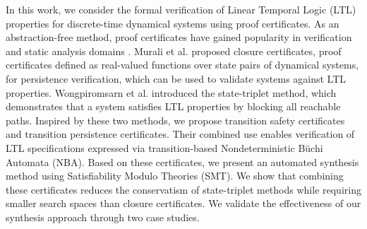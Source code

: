 In this work, we consider the formal verification of Linear Temporal Logic (LTL) properties for discrete-time dynamical systems using proof certificates. As an abstraction-free method, proof certificates have gained popularity in verification and static analysis domains \cite{chakarov2013probabilistic,chatterjee2016algorithmic,chatterjee2024sound,chatterjee2024equivalence}. Murali et al. \cite{murali2024closure} proposed closure certificates, proof certificates defined as real-valued functions over state pairs of dynamical systems, for persistence verification, which can be used to validate systems against LTL properties. Wongpiromsarn et al. \cite{wongpiromsarn2015automata} introduced the state-triplet method, which demonstrates that a system satisfies LTL properties by blocking all reachable paths. Inspired by these two methods, we propose transition safety certificates and transition persistence certificates. Their combined use enables verification of LTL specifications expressed via transition-based Nondeterministic Büchi Automata (NBA)\cite{buchi1966symposium}. Based on these certificates, we present an automated synthesis method using Satisfiability Modulo Theories (SMT). We show that combining these certificates reduces the conservatism of state-triplet methods while requiring smaller search spaces than closure certificates. We validate the effectiveness of our synthesis approach through two case studies.


